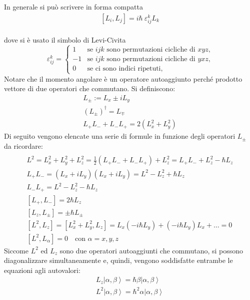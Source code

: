 In generale si può scrivere in forma compatta
\begin{equation}\begin{split}
\left[L_i,L_j\right]=i\hbar\ \varepsilon^{k}_{ij} L_k
\end{split}\end{equation}\\
dove si è usato il simbolo di Levi-Civita
 \[
 \varepsilon^{k}_{ij}=\begin{cases} 
 1 & \text{se $ijk$ sono permutazioni cicliche di $xyz$,}\\
 -1 & \text{se $ijk$ sono permutazioni cicliche di $yxz$,}\\
 0 & \text{se ci sono indici ripetuti,}
 \end{cases}
\]
Notare che il momento angolare è un operatore autoaggiunto perché prodotto vettore di due operatori che commutano.
Si definiscono:
\begin{equation}
\begin{split} 
L_\pm :=L_x\pm iL_y \\ \left(L_\pm\right)^\dagger=L_\mp \\ L_+L_-+L_-L_+=2\left(L_x^2+L_y^2\right)\end{split}
\end{equation}
Di seguito vengono elencate una serie di formule in funzione degli operatori $L_\pm$ da ricordare:
\begin{equation}
\begin{split}  \\L^2=L_x^2+L_y^2+L_z^2=\frac{1}{2}\left(L_+L_-+L_-L_+\right)+L_z^2=L_+L_-+L_z^2-\hbar L_z \\ L_+L_-=\left(L_x+iL_y\right)\left(L_x+iL_y\right)=L^2-L_z^2+\hbar L_z \\ L_-L_+=L^2-L_z^2-\hbar L_z \\ \left[L_+,L_-\right]=2\hbar L_z \\ \left[L_z,L_\pm\right]=\pm \hbar L_\pm \\ \left[L^2,L_z\right]=\left[L_x^2+L_y^2,L_z\right]=L_x\left(-i\hbar L_y\right)+\left(-i\hbar L_y\right)L_x+\dots =0 \\ \left[L^2,L_\alpha\right]=0 \quad \textrm{con }\alpha=x,y,z 
\end{split}
\end{equation}
Siccome $L^2$ ed $L_z$ sono due operatori autoaggiunti che commutano, si possono diagonalizzare simultaneamente e, quindi, vengono soddisfatte entrambe le equazioni agli autovalori:
\begin{equation}\begin{split}
L_z\left |\alpha,\beta \right\rangle=\hbar\beta\left |\alpha,\beta \right\rangle \\
L^2\left |\alpha,\beta \right\rangle=\hbar ^2\alpha\left |\alpha,\beta \right\rangle
\end{split}\end{equation}
